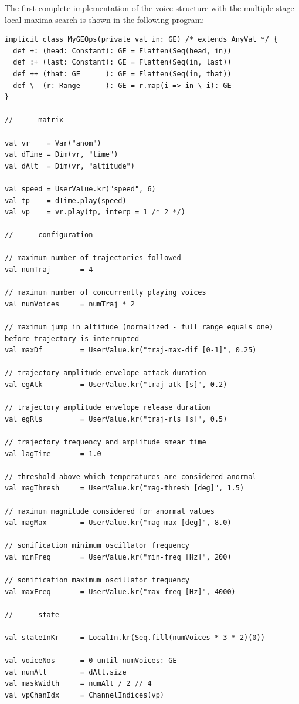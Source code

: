 \documentclass[11pt,a4paper]{article}
\begin{document}
The first complete implementation of the voice structure with the multiple-stage local-maxima search is shown in the following program:
%
\begin{lstlisting}[style=scala-small]
implicit class MyGEOps(private val in: GE) /* extends AnyVal */ {
  def +: (head: Constant): GE = Flatten(Seq(head, in))
  def :+ (last: Constant): GE = Flatten(Seq(in, last))
  def ++ (that: GE      ): GE = Flatten(Seq(in, that))
  def \  (r: Range      ): GE = r.map(i => in \ i): GE
}

// ---- matrix ----

val vr    = Var("anom")
val dTime = Dim(vr, "time")
val dAlt  = Dim(vr, "altitude")

val speed = UserValue.kr("speed", 6)
val tp    = dTime.play(speed)
val vp    = vr.play(tp, interp = 1 /* 2 */)

// ---- configuration ----

// maximum number of trajectories followed
val numTraj       = 4

// maximum number of concurrently playing voices
val numVoices     = numTraj * 2

// maximum jump in altitude (normalized - full range equals one) before trajectory is interrupted
val maxDf         = UserValue.kr("traj-max-dif [0-1]", 0.25)

// trajectory amplitude envelope attack duration
val egAtk         = UserValue.kr("traj-atk [s]", 0.2)

// trajectory amplitude envelope release duration
val egRls         = UserValue.kr("traj-rls [s]", 0.5)

// trajectory frequency and amplitude smear time
val lagTime       = 1.0

// threshold above which temperatures are considered anormal
val magThresh     = UserValue.kr("mag-thresh [deg]", 1.5)

// maximum magnitude considered for anormal values
val magMax        = UserValue.kr("mag-max [deg]", 8.0)

// sonification minimum oscillator frequency
val minFreq       = UserValue.kr("min-freq [Hz]", 200)

// sonification maximum oscillator frequency
val maxFreq       = UserValue.kr("max-freq [Hz]", 4000)

// ---- state ----

val stateInKr     = LocalIn.kr(Seq.fill(numVoices * 3 * 2)(0))

val voiceNos      = 0 until numVoices: GE
val numAlt        = dAlt.size
val maskWidth     = numAlt / 2 // 4
val vpChanIdx     = ChannelIndices(vp)


\end{lstlisting}
\end{document}
